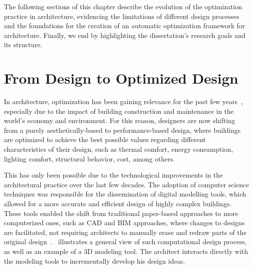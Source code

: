 	The following sections of this chapter describe the evolution of the optimization practice in architecture, evidencing the limitations of different design processes and the foundations for the creation of an automatic optimization framework for architecture. Finally, we end by highlighting the dissertation's research goals and its structure.

\section{From Design to Optimized Design}
	
	In architecture, optimization has been gaining relevance for the past few years~\cite{Cichocka2017SURVEY}, especially due to the impact of building construction and maintenance in the world's economy and environment. For this reason, designers are now shifting from a purely aesthetically-based to performance-based design, where buildings are optimized to achieve the best possible values regarding different characteristics of their design, such as thermal comfort, energy consumption, lighting comfort, structural behavior, cost, among others.

	This has only been possible due to the technological improvements in the architectural practice over the last few decades. The adoption of computer science techniques was responsible for the dissemination of digital modelling tools, which allowed for a more accurate and efficient design of highly complex buildings. These tools enabled the shift from traditional paper-based approaches to more computerized ones, such as \ac{CAD} and \ac{BIM} approaches, where changes to designs are facilitated, not requiring architects to manually erase and redraw parts of the original design~\cite{Ferreira2015GD}.~ illustrates a general view of such computational design process, as well as an example of a 3D modeling tool. The architect interacts directly with the modeling tools to incrementally develop his design ideas.
	

